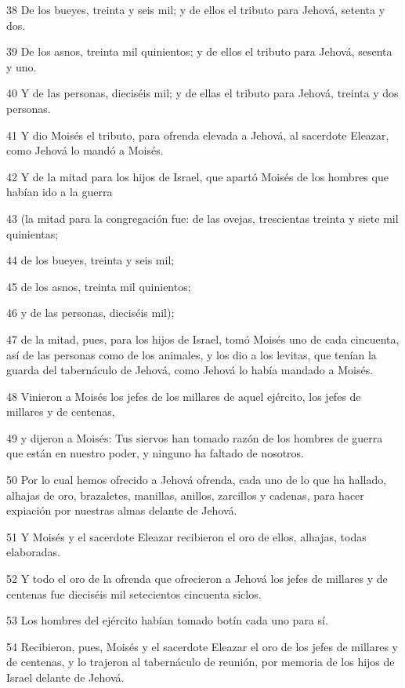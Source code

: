 \par 38 De los bueyes, treinta y seis mil; y de ellos el tributo para Jehová, setenta y dos.
\par 39 De los asnos, treinta mil quinientos; y de ellos el tributo para Jehová, sesenta y uno. 
\par 40 Y de las personas, dieciséis mil; y de ellas el tributo para Jehová, treinta y dos personas.
\par 41 Y dio Moisés el tributo, para ofrenda elevada a Jehová, al sacerdote Eleazar, como Jehová lo mandó a Moisés.
\par 42 Y de la mitad para los hijos de Israel, que apartó Moisés de los hombres que habían ido a la guerra
\par 43 (la mitad para la congregación fue: de las ovejas, trescientas treinta y siete mil quinientas;
\par 44 de los bueyes, treinta y seis mil;
\par 45 de los asnos, treinta mil quinientos;
\par 46 y de las personas, dieciséis mil);
\par 47 de la mitad, pues, para los hijos de Israel, tomó Moisés uno de cada cincuenta, así de las personas como de los animales, y los dio a los levitas, que tenían la guarda del tabernáculo de Jehová, como Jehová lo había mandado a Moisés.
\par 48 Vinieron a Moisés los jefes de los millares de aquel ejército, los jefes de millares y de centenas,
\par 49 y dijeron a Moisés: Tus siervos han tomado razón de los hombres de guerra que están en nuestro poder, y ninguno ha faltado de nosotros.
\par 50 Por lo cual hemos ofrecido a Jehová ofrenda, cada uno de lo que ha hallado, alhajas de oro, brazaletes, manillas, anillos, zarcillos y cadenas, para hacer expiación por nuestras almas delante de Jehová.
\par 51 Y Moisés y el sacerdote Eleazar recibieron el oro de ellos, alhajas, todas elaboradas.
\par 52 Y todo el oro de la ofrenda que ofrecieron a Jehová los jefes de millares y de centenas fue dieciséis mil setecientos cincuenta siclos.
\par 53 Los hombres del ejército habían tomado botín cada uno para sí.
\par 54 Recibieron, pues, Moisés y el sacerdote Eleazar el oro de los jefes de millares y de centenas, y lo trajeron al tabernáculo de reunión, por memoria de los hijos de Israel delante de Jehová.

